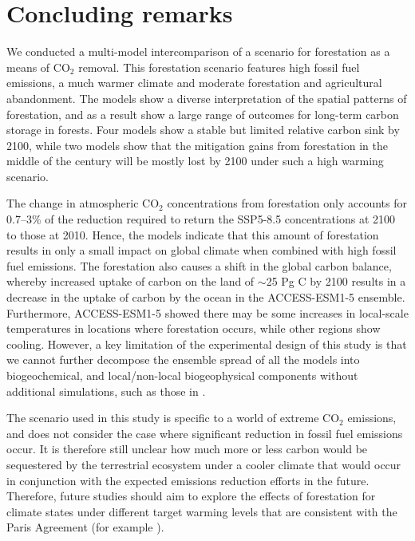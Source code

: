 \documentclass[draft]{agujournal2019}
\begin{document}
\section{Concluding remarks}

We conducted a multi-model intercomparison of a scenario for forestation as a means of CO$_2$ removal.
This forestation scenario features high fossil fuel emissions, a much warmer climate and moderate forestation and agricultural abandonment.
The models show a diverse interpretation of the spatial patterns of forestation, and as a result show a large range of outcomes for long-term carbon storage in forests.
Four models show a stable but limited relative carbon sink by 2100, while two models show that the mitigation gains from forestation in the middle of the century will be mostly lost by 2100 under such a high warming scenario.

The change in atmospheric CO$_2$ concentrations from forestation only accounts for 0.7--3\% of the reduction required to return the SSP5-8.5 concentrations at 2100 to those at 2010.
Hence, the models indicate that this amount of forestation results in only a small impact on global climate when combined with high fossil fuel emissions.
The forestation also causes a shift in the global carbon balance, whereby increased uptake of carbon on the land of $\sim$25 Pg C by 2100 results in a decrease in the uptake of carbon by the ocean in the ACCESS-ESM1-5 ensemble.
Furthermore, ACCESS-ESM1-5 showed there may be some increases in local-scale temperatures in locations where forestation occurs, while other regions show cooling.
However, a key limitation of the experimental design of this study is that we cannot further decompose the ensemble spread of all the models into biogeochemical, and local/non-local biogeophysical components without additional simulations, such as those in .

The scenario used in this study is specific to a world of extreme CO$_2$ emissions, and does not consider the case where significant reduction in fossil fuel emissions occur.
It is therefore still unclear how much more or less carbon would be sequestered by the terrestrial ecosystem under a cooler climate that would occur in conjunction with the expected emissions reduction efforts in the future.
Therefore, future studies should aim to explore the effects of forestation for climate states under different target warming levels that are consistent with the Paris Agreement  (for example ).
\end{document}
